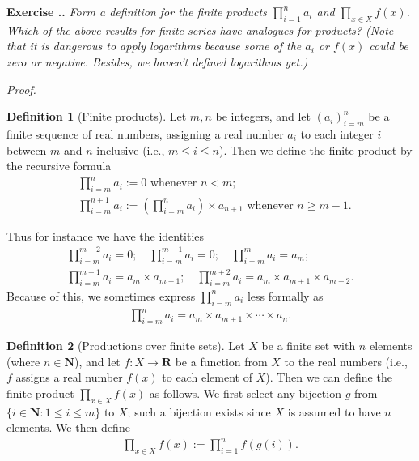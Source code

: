 \documentclass{book}
\newcommand{\pff}{\vspace{.25em}\noindent\emph{Proof.}~~}
\newcommand{\titl}[1]{\noindent\textbf{#1}}
\newcounter{Exercise}[section]
\renewcommand{\theExercise}{\thesection.\arabic{Exercise}.}
\newcommand{\new}{\vspace{1.5em}\noindent\textbf{{Exercise \stepcounter{Exercise}\textbf{\theExercise}}} }
\begin{document}
\new\emph{Form a definition for the finite products $\prod_{i=1}^{n}a_i$ and $\prod_{x\in X}f(x)$. Which of the above results for finite series have analogues for products? (Note that it is dangerous to apply logarithms because some of the $a_i$ or $f(x)$ could be zero or negative. Besides, we haven't defined logarithms yet.)}

\pff
\begin{framed}
\titl{Definition 1} (Finite products). Let $m, n$ be integers, and let $(a_i)_{i=m}^n$ be a finite sequence of real numbers, assigning a real number $a_i$ to each integer $i$ between $m$ and $n$ inclusive (i.e., $m\leq i\leq n$). Then we define the finite product by the recursive formula
    \begin{align*}
        &\prod_{i=m}^{n}a_i:=0\text{ whenever }n<m;\\
        &\prod_{i=m}^{n+1}a_i:=\left(\prod_{i=m}^na_i\right)\times a_{n+1}\text{ whenever }n\geq m-1.
    \end{align*}

    Thus for instance we have the identities
    \begin{gather*}
        \prod_{i=m}^{m-2}a_i=0;\quad\prod_{i=m}^{m-1}a_i=0;\quad\prod_{i=m}^{m}a_i=a_m;\\
        \prod_{i=m}^{m+1}a_i=a_m\times a_{m+1};\quad\prod_{i=m}^{m+2}a_i=a_m\times a_{m+1}\times a_{m+2}.
    \end{gather*}
Because of this, we sometimes express $\prod_{i=m}^{n}a_i$ less formally as
    \begin{align*}
        \prod_{i=m}^{n}a_i=a_m\times a_{m+1}\times\cdots\times a_n.
    \end{align*}
\end{framed}

\begin{framed}
\titl{Definition 2} (Productions over finite sets). Let $X$ be a finite set with $n$ elements (where $n\in\mathbf{N}$), and let $f:X\to\mathbf{R}$ be a function from $X$ to the real numbers (i.e., $f$ assigns a real number $f(x)$ to each element of $X$). Then we can define the finite product $\prod_{x\in X}f(x)$ as follows. We first select any bijection $g$ from $\{i\in\mathbf{N}:1\leq i\leq m\}$ to $X$; such a bijection exists since $X$ is assumed to have $n$ elements. We then define
    \begin{align*}
        \prod_{x\in X}f(x):=\prod_{i=1}^{n}f(g(i)).
    \end{align*}
\end{framed}
\end{document}

